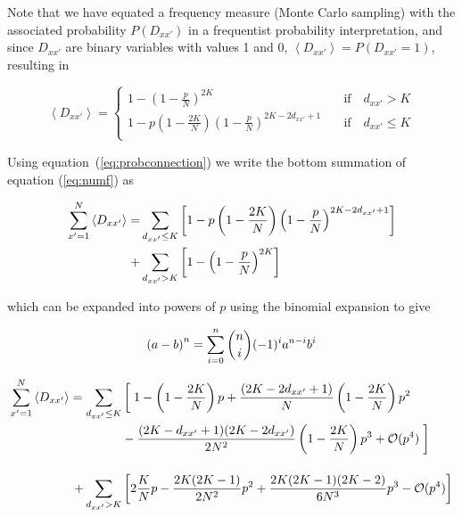 Note that we have equated a frequency measure (Monte Carlo sampling) with the associated probability $P(D_{xx'})$ in a frequentist
probability interpretation, and since $D_{xx'}$ are binary variables with values 1 and 0, $\left<D_{xx'}\right> = P(D_{xx'}=1)$,
resulting in

\begin{equation}
    \left<D_{xx'}\right> =
    \begin{cases}
        1-\left( 1 - \frac{p}{N} \right)^{2K} \quad &\text{if} \quad d_{xx'}>K\\
        1-p\left( 1 - \frac{2K}{N} \right)\left( 1 - \frac{p}{N} \right)^{2K-2d_{xx'}+1} \quad &\text{if} \quad d_{xx'}\leq K\\
    \end{cases}
    \label{eq:probconnection}
\end{equation}

Using equation~(\ref{eq:probconnection}) we write the bottom summation of equation (\ref{eq:numf}) as

\begin{align}
    \sum_{x'=1}^N \left< D_{xx'} \right> = &\sum_{d_{xx'}\leq K} \left[
    1 - p\left(1-\frac{2K}{N}\right)\left(1-\frac{p}{N}\right)^{2K - 2d_{xx'} + 1} \right] \notag\\
        + &\sum_{d_{xx'}>K} \left[ 1 - \left( 1 - \frac{p}{N} \right)^{2K} \right]
\end{align}

\noindent which can be expanded into powers of $p$ using the binomial expansion to give

\begin{align}
    \left( a - b \right)^n = \sum_{i=0}^n \binom{n}{i}(-1)^ia^{n-i}b^{i} \notag
\end{align}

\begin{align}
    \label{eq:ppower}
    \begin{split}
    \sum_{x'=1}^N \left< D_{xx'} \right> = \sum_{d_{xx'}\leq K} &\left[ \vphantom{\frac{2K}{N}} \right. 1 - \left( 1 - \frac{2K}{N} \right) p + \frac{\left( 2K-2d_{xx'}+1 \right)}{N} \left( 1 - \frac{2K}{N} \right) p^2 \\
    &- \frac{(2K-d_{xx'}+1)(2K-2d_{xx'})}{2N^2}\left( 1 - \frac{2K}{N} \right)p^3 + \mathcal{O}(p^4) \left. \vphantom{\frac{2K}{N}} \right] \\[12pt]
    +\sum_{d_{xx'}> K} &\left[ 2\frac{K}{N}p - \frac{2K(2K-1)}{2N^2}p^2 + \frac{2K(2K-1)(2K-2)}{6N^3}p^3 - \mathcal{O}(p^4) \right]
    \end{split}
\end{align}

